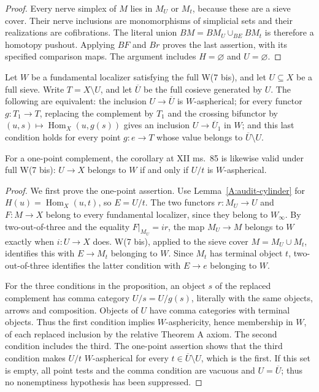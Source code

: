 \begin{proof}
Every nerve simplex of $M$ lies in $M_U$ or $M_t$, because these are a sieve cover. Their nerve inclusions are monomorphisms of simplicial sets and their realizations are cofibrations. The literal union $BM=BM_U\cup_{BE}BM_t$ is therefore a homotopy pushout. Applying $BF$ and $Br$ proves the last assertion, with its specified comparison maps. The argument includes $H=\varnothing$ and $U=\varnothing$.
\end{proof}

\begin{proposition}\label{A:audit-prop7}
Let $W$ be a fundamental localizer satisfying the full W(7 bis), and let $U\subseteq X$ be a full sieve. Write $T=X\setminus U$, and let $\overline U$ be the full cosieve generated by $U$. The following are equivalent: the inclusion $U\to\overline U$ is $W$-aspherical; for every functor $g:T_1\to T$, replacing the complement by $T_1$ and the crossing bifunctor by $(u,s)\mapsto\operatorname{Hom}_X(u,g(s))$ gives an inclusion $U\to\overline U_1$ in $W$; and this last condition holds for every point $g:e\to T$ whose value belongs to $\overline U\setminus U$.

For a one-point complement, the corollary at XII ms.~85 is likewise valid under full W(7 bis): $U\to X$ belongs to $W$ if and only if $U/t$ is $W$-aspherical.
\end{proposition}

\begin{proof}
We first prove the one-point assertion. Use Lemma~\ref{A:audit-cylinder} for $H(u)=\operatorname{Hom}_X(u,t)$, so $E=U/t$. The two functors $r:M_U\to U$ and $F:M\to X$ belong to every fundamental localizer, since they belong to $W_\infty$. By two-out-of-three and the equality $F|_{M_U}=ir$, the map $M_U\to M$ belongs to $W$ exactly when $i:U\to X$ does. W(7 bis), applied to the sieve cover $M=M_U\cup M_t$, identifies this with $E\to M_t$ belonging to $W$. Since $M_t$ has terminal object $t$, two-out-of-three identifies the latter condition with $E\to e$ belonging to $W$.

For the three conditions in the proposition, an object $s$ of the replaced complement has comma category $U/s=U/g(s)$, literally with the same objects, arrows and composition. Objects of $U$ have comma categories with terminal objects. Thus the first condition implies $W$-asphericity, hence membership in $W$, of each replaced inclusion by the relative Theorem A axiom. The second condition includes the third. The one-point assertion shows that the third condition makes $U/t$ $W$-aspherical for every $t\in\overline U\setminus U$, which is the first. If this set is empty, all point tests and the comma condition are vacuous and $U=\overline U$; thus no nonemptiness hypothesis has been suppressed.
\end{proof}


